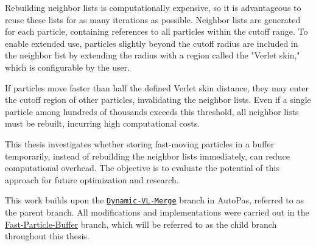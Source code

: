 

Rebuilding neighbor lists is computationally expensive, so it is advantageous to reuse these lists for as many iterations as possible. Neighbor lists are generated for each particle, containing references to all particles within the cutoff range. To enable extended use, particles slightly beyond the cutoff radius are included in the neighbor list by extending the radius with a region called the "Verlet skin," which is configurable by the user.

If particles move faster than half the defined Verlet skin distance, they may enter the cutoff region of other particles, invalidating the neighbor lists. Even if a single particle among hundreds of thousands exceeds this threshold, all neighbor lists must be rebuilt, incurring high computational costs. 

This thesis investigates whether storing fast-moving particles in a buffer temporarily, instead of rebuilding the neighbor lists immediately, can reduce computational overhead. The objective is to evaluate the potential of this approach for future optimization and research.

This work builds upon the \href{https://github.com/AutoPas/AutoPas/tree/Dynamic-VL-merge}{\texttt{Dynamic-VL-Merge}} branch in AutoPas, referred to as the parent branch. All modifications and implementations were carried out in the \href{https://github.com/AutoPas/AutoPas/tree/Fast-Particle-Buffer}{Fast-Particle-Buffer} branch, which will be referred to as the child branch throughout this thesis.

